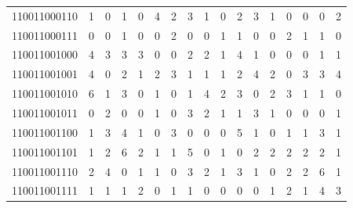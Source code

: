 \documentclass[10pt,a4paper]{article}
\begin{document}
\begin{longtable}{ |c|c|c|c|c|c|c|c|c|c|c|c|c|c|c|c|c| }
    110011000110              & 1                            & 0                                & 1                            & 0                              & 4   & 2   & 3   & 1   & 0   & 2   & 3   & 1   & 0   & 0   & 0   & 2   \\
    110011000111              & 0                            & 0                                & 1                            & 0                              & 0   & 2   & 0   & 0   & 1   & 1   & 0   & 0   & 2   & 1   & 1   & 0   \\
    110011001000              & 4                            & 3                                & 3                            & 3                              & 0   & 0   & 2   & 2   & 1   & 4   & 1   & 0   & 0   & 0   & 1   & 1   \\
    110011001001              & 4                            & 0                                & 2                            & 1                              & 2   & 3   & 1   & 1   & 1   & 2   & 4   & 2   & 0   & 3   & 3   & 4   \\
    110011001010              & 6                            & 1                                & 3                            & 0                              & 1   & 0   & 1   & 4   & 2   & 3   & 0   & 2   & 3   & 1   & 1   & 0   \\
    110011001011              & 0                            & 2                                & 0                            & 0                              & 1   & 0   & 3   & 2   & 1   & 1   & 3   & 1   & 0   & 0   & 0   & 1   \\
    110011001100              & 1                            & 3                                & 4                            & 1                              & 0   & 3   & 0   & 0   & 0   & 5   & 1   & 0   & 1   & 1   & 3   & 1   \\
    110011001101              & 1                            & 2                                & 6                            & 2                              & 1   & 1   & 5   & 0   & 1   & 0   & 2   & 2   & 2   & 2   & 2   & 1   \\
    110011001110              & 2                            & 4                                & 0                            & 1                              & 1   & 0   & 3   & 2   & 1   & 3   & 1   & 0   & 2   & 2   & 6   & 1   \\
    110011001111              & 1                            & 1                                & 1                            & 2                              & 0   & 1   & 1   & 0   & 0   & 0   & 0   & 1   & 2   & 1   & 4   & 3   \\

\end{longtable}
\end{document}
